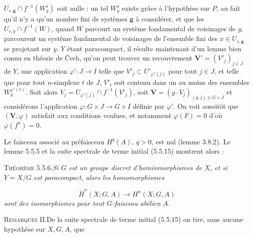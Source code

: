 \clearpage
{}

\noindent $U_{s,\mathbf g}\cap f^{-1}(W^s_y)$ soit nulle : un tel $W^s_y$
existe grâce à l'hypothèse sur $P$, au fait qu'il n'y a qu'un nombre fini de
systèmes $\mathbf g$ à considérer, et que les
$U_{s,g}\cap f^{-1}(W)$, quand $W$ parcourt un système fondamental de
voisinages de $y$, parcourent un systême fondamental de voisinages de
l'ensemble fini des $x\in U_{s,\mathbf g}$ se projetant sur $y$. $Y$ étant
paracompact, il résulte maintenant d'un lemme bien connu en théorie de Čech,
qu'on peut trouver un recouvrement ${\mathbf V}'=(V'_j)_{j\in J}$ de $Y$, une
application $\varphi':J\to I$ telle que $V'_j\subset U'_{\varphi'(j)}$ pour
tout $j\in J$, et telle que pour tout $n$-simplexe $t$ de $J$, $V'_t$ soit
contenu dans un au moins des ensembles $W_y^{\varphi'(t)}$. Soit alors
$V_j=U_{\varphi'(j)}\cap f^{-1}(V'_j)$, soit
${\mathbf V}=(g\cdot V_j)_{(g,j)\in G\times J}$ et considérons l'application
$\varphi:G\times J\to G\times I$ définie par $\varphi'$. On voit aussitôt que
$({\mathbf V},\varphi)$ satisfait aux conditions voulues, et notamment
$\varphi(F)=0$ d'où $\overline\varphi(f^n)=0$.

Le faisceau associé au préfaisceau $H^q(A)$, $q>0$, est nul (lemme 3.8.2). Le
lemme 5.5.5 et la suite spectrale de terme initial (5.5.15) montrent alors :

\textsc{Théorème 5.5.6.}\quad \textit{Si $G$ est un groupe discret
d'homéomorphismes de $X$, et si $Y=X/G$ est paracompact, alors les
homomorphismes}

\[
\tag{5.5.14}
\check H^n(X;G,A)\to H^n(X;G,A)
\]
\textit{sont des isomorphismes pour tout $G$-faisceau abélien $A$.}

\textsc{Remarques II.}\quad De la suite spectrale de terme initial
(5.5.15) on tire, sans aucune hypothèse sur $X,G,A$, que


